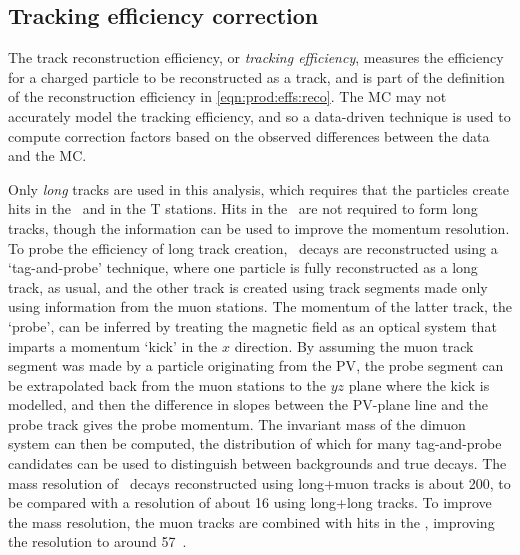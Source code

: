 \subsection{Tracking efficiency correction}
\label{chap:prod:effs:tracking}

The track reconstruction efficiency, or \emph{tracking efficiency}, measures 
the efficiency for a charged particle to be reconstructed as a track, and is 
part of the definition of the reconstruction efficiency in 
\cref{eqn:prod:effs:reco}.
The \ac{MC} may not accurately model the tracking efficiency, and so a 
data-driven technique is used to compute correction factors based on the 
observed differences between the data and the \ac{MC}.

Only \emph{long} tracks are used in this analysis, which requires that the 
particles create hits in the \velo\ and in the T stations.
Hits in the \ttracker\ are not required to form long tracks, though the 
information can be used to improve the momentum resolution.
To probe the efficiency of long track creation, \JpsiTomumu\ decays are 
reconstructed using a `tag-and-probe' technique, where one particle is fully 
reconstructed as a long track, as usual, and the other track is created using 
track segments made only using information from the muon stations.
The momentum of the latter track, the `probe', can be inferred by treating the 
magnetic field as an optical system that imparts a momentum `kick' in the $x$ 
direction.
By assuming the muon track segment was made by a particle originating from the 
\ac{PV}, the probe segment can be extrapolated back from the muon stations to 
the $yz$ plane where the kick is modelled, and then the difference in slopes 
between the \ac{PV}-plane line and the probe track gives the probe momentum.
The invariant mass of the dimuon system can then be computed, the distribution 
of which for many tag-and-probe candidates can be used to distinguish between 
backgrounds and true \PJpsi decays.
The mass resolution of \JpsiTomumu\ decays reconstructed using long+muon tracks 
is about \SI{200}{\MeVcc}, to be compared with a resolution of about 
\SI{16}{\MeVcc} using long+long tracks.
To improve the mass resolution, the muon tracks are combined with hits in the 
\ttracker, improving the resolution to around 
\SI{57}{\MeVcc}~\cite{Aaij:2014pwa,DeCian:2013zua}.

